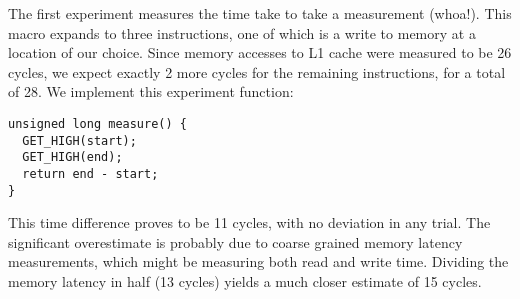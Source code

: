 The first experiment measures the time take to take a measurement (whoa!). This macro expands to three instructions, one of which is a write to memory at a location of our choice. Since memory accesses to L1 cache were measured to be 26 cycles, we expect exactly 2 more cycles for the remaining instructions, for a total of 28. We implement this experiment function: 
\begin{verbatim}
unsigned long measure() {
  GET_HIGH(start);
  GET_HIGH(end);
  return end - start;
}
\end{verbatim}

This time difference proves to be 11 cycles, with no deviation in any trial. The significant overestimate is probably due to coarse grained memory latency measurements, which might be measuring both read and write time. Dividing the memory latency in half (13 cycles) yields a much closer estimate of 15 cycles.